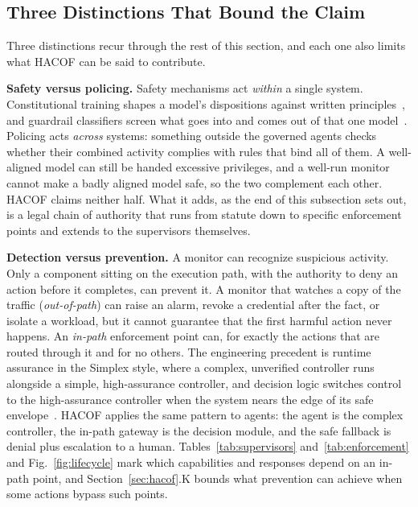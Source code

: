 \documentclass{ieeeaccess}
\newcommand{\hacof}{HACOF}
\begin{document}
\subsection{Three Distinctions That Bound the Claim}
\label{sec:hacof-b}

Three distinctions recur through the rest of this section, and each one also limits what \hacof{} can be said to contribute.

\textbf{Safety versus policing.} Safety mechanisms act \textit{within} a single system. Constitutional training shapes a model's dispositions against written principles~\cite{bai2022constitutional},
and guardrail classifiers screen what goes into and comes out of that one model~\cite{inan2023llamaguard,sharma2025constitutionalclassifiers}.
Policing acts \textit{across} systems: something outside the governed agents checks whether their combined activity complies with rules that bind all of them. A well-aligned model can still be handed excessive privileges, and a well-run monitor cannot make a badly aligned model safe, so the two complement each other. \hacof{} claims neither half. What it adds, as the end of this subsection sets out, is a legal chain of authority that runs from statute down to specific enforcement points and extends to the supervisors themselves.

\textbf{Detection versus prevention.} A monitor can recognize suspicious activity. Only a component sitting on the execution path, with the authority to deny an action before it completes, can prevent it. A monitor that watches a copy of the traffic (\textit{out-of-path}) can raise an alarm, revoke a credential after the fact, or isolate a workload, but it cannot guarantee that the first harmful action never happens. An \textit{in-path} enforcement point can, for exactly the actions that are routed through it and for no others. The engineering precedent is runtime assurance in the Simplex style, where a complex, unverified controller runs alongside a simple, high-assurance controller, and decision logic switches control to the high-assurance controller when the system nears the edge of its safe envelope~\cite{sha2001simplex}.
\hacof{} applies the same pattern to agents: the agent is the complex controller, the in-path gateway is the decision module, and the safe fallback is denial plus escalation to a human. Tables~\ref{tab:supervisors} and~\ref{tab:enforcement} and Fig.~\ref{fig:lifecycle} mark which capabilities and responses depend on an in-path point, and Section~\ref{sec:hacof}.K bounds what prevention can achieve when some actions bypass such points.
\end{document}
